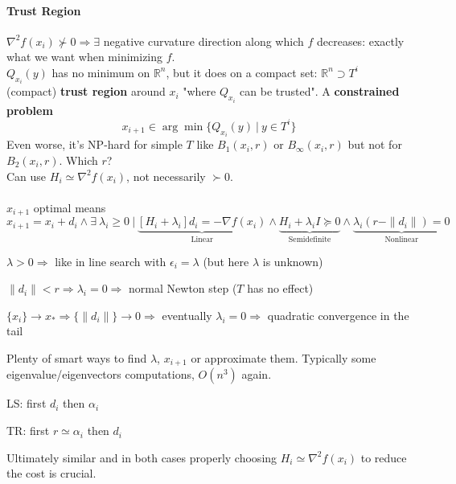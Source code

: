 \documentclass[10pt]{report}
\begin{document}
\paragraph{Trust Region} $\nabla^2f(x_i)\not\succ 0\Rightarrow\exists$ negative curvature direction along which $f$ decreases: exactly what we want when minimizing $f$.\\
$Q_{x_i}(y)$ has no minimum on $\mathbb{R}^n$, but it does on a compact set: $\mathbb{R}^n \supset T^i$ (compact) \textbf{trust region} around $x_i$ "where $Q_{x_i}$ can be trusted". A \textbf{constrained problem}
$$x_{i+1}\in\arg\min\{Q_{x_i}(y)\:|\:y\in T^i\}$$
Even worse, it's NP-hard for simple $T$ like $B_1(x_i,r)$ or $B_\infty(x_i,r)$ but not for $B_2(x_i,r)$. Which $r$?\\
Can use $H_i\simeq \nabla^2f(x_i)$, not necessarily $\succ 0$.\\\\
$x_{i+1}$ optimal means $$x_{i+1} = x_i+d_i\wedge\exists\:\lambda_i\geq 0\:|\:\underset{\text{Linear}}{\underbrace{[H_i+\lambda_i]d_i=-\nabla f(x_i)}} \wedge \underset{\text{Semidefinite}}{\underbrace{H_i+\lambda_i I\succeq 0}} \wedge \underset{\text{Nonlinear}}{\underbrace{\lambda_i(r-\|d_i\|)=0}}$$
\begin{list}{}{}
	\item $\lambda > 0\Rightarrow$ like in line search with $\epsilon_i=\lambda$ (but here $\lambda$ is unknown)
	\item $\|d_i\|<r\Rightarrow\lambda_i=0\Rightarrow$ normal Newton step ($T$ has no effect)
	\item $\{x_i\}\rightarrow x_*\Rightarrow\{\|d_i\|\}\rightarrow 0\Rightarrow$ eventually $\lambda_i=0\Rightarrow$ quadratic convergence in the tail
\end{list}
Plenty of smart ways to find $\lambda$, $x_{i+1}$ or approximate them. Typically some eigenvalue/eigenvectors computations, $O(n^3)$ again.
\begin{list}{}{}
	\item LS: first $d_i$ then $\alpha_i$
	\item TR: first $r\simeq \alpha_i$ then $d_i$
\end{list}
Ultimately similar and in both cases properly choosing $H_i\simeq \nabla^2f(x_i)$ to reduce the cost is crucial.
\end{document}
